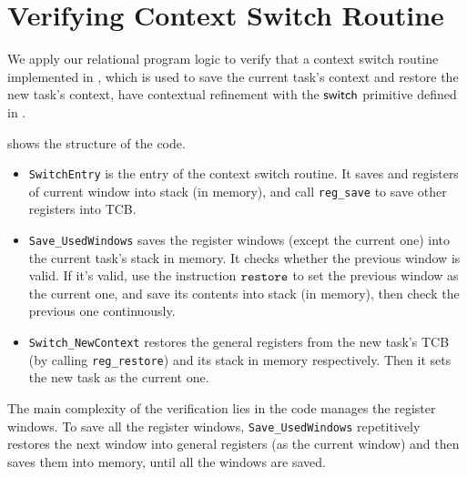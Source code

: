\section{Verifying Context Switch Routine}
\label{sec:ctxswitch}

\indent
We apply our relational program logic to verify
that a context switch routine implemented in \sparc,
which is used to save the current task's context and
restore the new task's context, 
have contextual refinement with the $\mathsf{switch}{}$ primitive 
defined in \Sec{\ref{sec:refine-verification-sparc}}. 

\Fig{\ref{fig:The Structure of Context Switch Routine}}
shows the structure of the code.
\begin{center}
    
	\label{fig:The Structure of Context Switch Routine}
\end{center}
\begin{itemize}
    \item \texttt{SwitchEntry}
    is the entry of the context switch routine. 
    It saves \localRN{} and \inRN{} registers of current
    window into stack (in memory), and call 
    \texttt{reg\_save} to save other registers into TCB.
    
    \item
    \texttt{Save\_UsedWindows} saves
	the register windows (except the current one)
    into the current task's stack in memory. 
    It checks whether the previous window is valid. 
    If it's valid, use the instruction $\texttt{restore}{}$ 
    to set the previous window as the current one, 
    and save its contents into stack (in memory), 
    then check the previous one continuously.

    \item     
    \texttt{Switch\_NewContext}
    restores the general registers from the new task's TCB 
    (by calling \texttt{reg\_restore})
    and its stack in memory 
    respectively. Then it sets the new task as
    the current one.
\end{itemize}

The main complexity of the verification lies in
the code manages the register windows.
To save all the register windows, \texttt{Save\_UsedWindows}
repetitively restores the next window into general registers
(as the current window)
and then saves them into memory, until all the windows are saved.


